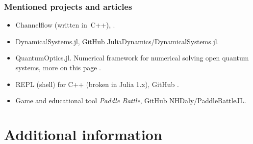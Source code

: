 \documentclass[10pt,t]{beamer}
\begin{document}
\begin{frame}
  \frametitle{Mentioned projects and articles}


  \begin{itemize}

  \item Channelflow (written in~C++),
    .

  \item DynamicalSystems.jl, GitHub
    {JuliaDynamics/DynamicalSystems.jl}.

  \item QuantumOptics.jl. Numerical framework for numerical
    solving open quantum systems, more on this page
    .

  \item REPL (shell) for C++ (broken in Julia 1.x), GitHub
    .

  \item Game and educational tool \textit{Paddle Battle}, GitHub
    {NHDaly/PaddleBattleJL}.

  \end{itemize}

\end{frame}










\section{Additional information}
\end{document}
